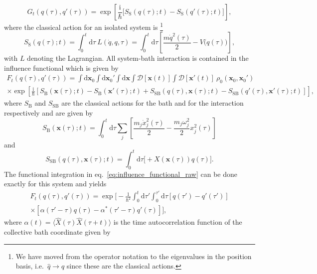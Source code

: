 \begin{equation}
	G_t(q(\tau),q'(\tau)) = \exp\left[\frac{\mathrm{i}}{\hbar}\bigl[S_\mathrm{S}(q(\tau);t)-S_\mathrm{S}(q'(\tau);t)\bigr]\right],
\end{equation}
where the classical action for an isolated system is \footnote[2]{We have moved from the operator notation to the eigenvalues in the position basis, i.e.~$\hat{q} \to q$ since these are the classical actions.}
\begin{equation}
	S_\mathrm{S}(q(\tau);t) = \int_0^t \mathrm{d}\tau\ L(\dot{q},q,\tau) = \int_0^t\mathrm{d}\tau\left[\frac{m\dot{q}^2(\tau)}{2}-V\bigl(q(\tau)\bigr)\right],
\end{equation}
with $L$ denoting the Lagrangian. All system-bath interaction is contained in the influence functional which is given by
\begin{multline}
	F_t(q(\tau),q'(\tau)) = \int\mathrm{d}\bm{x}_0
	\int\mathrm{d}\bm{x}_0'
	\int\mathrm{d}\bm{x} 
	\int\mathcal{D}[\bm{x}(t)]
	\int\mathcal{D}[\bm{x}'(t)]
	\ \rho_0(\bm{x}_0,\bm{x}_0')
	\\
	\times\exp\left[\frac{\mathrm{i}}{\hbar}[S_\mathrm{B}(\bm{x}(\tau);t)-S_\mathrm{B}(\bm{x}'(\tau);t)+S_\mathrm{SB}(q(\tau),\bm{x}(\tau);t)-S_\mathrm{SB}(q'(\tau),\bm{x}'(\tau);t)]\right],
	\label{eq:influence_functional_raw}
\end{multline}
where $S_\mathrm{B}$ and $S_\mathrm{SB}$ are the classical actions for the bath and for the interaction respectively and are given by
\begin{equation}
	S_\mathrm{B}(\bm{x}(\tau);t) = \int_0^t\mathrm{d}\tau \sum_j \left[
	\frac{m_j\dot{x}_j^2(\tau)}{2}
	 - \frac{m_j \omega_j^2}{2}x_j^2(\tau)
	 \right]
\end{equation}
and
\begin{equation}
S_\mathrm{SB}(q(\tau),\bm{x}(\tau);t) = \int_0^t\mathrm{d}\tau \bigl[
+X(\bm{x}(\tau))q(\tau)
\bigr].
\end{equation}
The functional integration in eq.~\ref{eq:influence_functional_raw} can be done exactly for this system and yields\supercite{Caldeira1983b}
\begin{multline}
	F_t(q(\tau),q'(\tau)) = \exp\biggl[-\frac{1}{\hbar^2}
	\int_0^t\mathrm{d}\tau'
	\int_0^{\tau'}\mathrm{d}\tau
	[q(\tau')-q'(\tau')] \\
	\times[\alpha(\tau'-\tau)q(\tau)-\alpha^*(\tau'-\tau)q'(\tau)]\biggr],
\end{multline}
where $\alpha(t) = \langle \hat{X}(\tau)\hat{X}(\tau+t)\rangle$ is the time autocorrelation function of the collective bath coordinate given by
